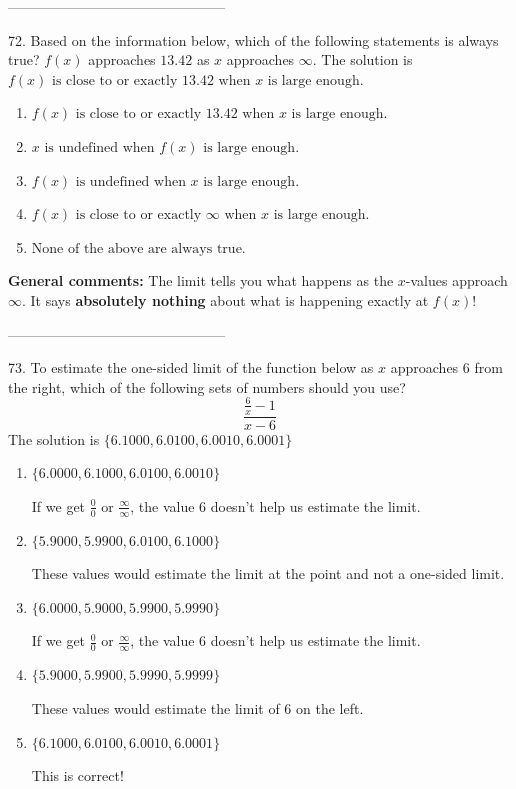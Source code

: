 \documentclass{extbook}[14pt]
\begin{document}
-----------------------------------------------

72. Based on the information below, which of the following statements is always true?
$f(x)$ approaches $13.42$ as $x$ approaches $\infty$. 
The solution is $ f(x) \text{ is close to or exactly } 13.42 \text{ when } x \text{ is large enough}. $ 

\begin{enumerate}[label=\Alph*.] 
\item $ f(x) \text{ is close to or exactly } 13.42 \text{ when } x \text{ is large enough}. $ 

  
\item $ x \text{ is undefined when } f(x) \text{ is large enough}. $ 

  
\item $ f(x) \text{ is undefined when } x \text{ is large enough}. $ 

  
\item $ f(x) \text{ is close to or exactly } \infty \text{ when } x \text{ is large enough}. $ 

  
\item $ \text{None of the above are always true.} $ 

  
\end{enumerate} 
 
\textbf{General comments:} The limit tells you what happens as the $x$-values approach $\infty$. It says \textbf{absolutely nothing} about what is happening exactly at $f(x)$!

-----------------------------------------------

73. To estimate the one-sided limit of the function below as $x$ approaches 6 from the right, which of the following sets of numbers should you use?
\[ \frac{\frac{6}{x} - 1}{x - 6} \] 
The solution is $ \{ 6.1000, 6.0100, 6.0010, 6.0001 \} $ 

\begin{enumerate}[label=\Alph*.] 
\item $ \{ 6.0000, 6.1000, 6.0100, 6.0010 \} $ 

 If we get $\frac{0}{0}$ or $\frac{\infty}{\infty}$, the value 6 doesn't help us estimate the limit. 
\item $ \{ 5.9000, 5.9900, 6.0100, 6.1000 \} $ 

 These values would estimate the limit at the point and not a one-sided limit. 
\item $ \{ 6.0000, 5.9000, 5.9900, 5.9990 \} $ 

 If we get $\frac{0}{0}$ or $\frac{\infty}{\infty}$, the value 6 doesn't help us estimate the limit. 
\item $ \{ 5.9000, 5.9900, 5.9990, 5.9999 \} $ 

 These values would estimate the limit of 6 on the left. 
\item $ \{ 6.1000, 6.0100, 6.0010, 6.0001 \} $ 

 This is correct! 
\end{enumerate} 
 
\end{document}
